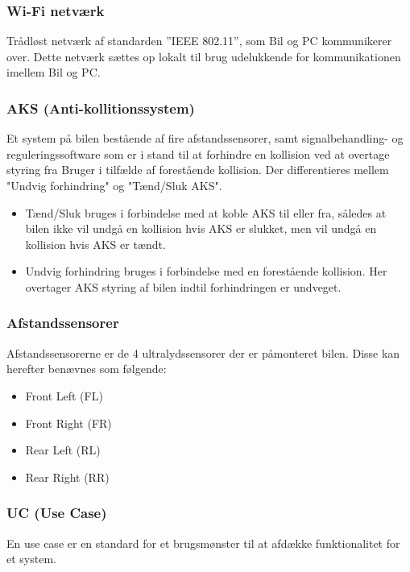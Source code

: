 \subsubsection{Wi-Fi netværk}
Trådløst netværk af standarden ''IEEE 802.11'', som Bil og PC kommunikerer over. Dette netværk sættes op lokalt til brug udelukkende for kommunikationen imellem Bil og PC. 

\subsubsection{AKS (Anti-kollitionssystem)}
Et system på bilen bestående af fire afstandssensorer, samt signalbehandling- og reguleringssoftware som er i stand til at forhindre en kollision ved at overtage styring fra Bruger i tilfælde af forestående kollision. Der differentieres mellem "Undvig forhindring" og "Tænd/Sluk AKS".

\begin{itemize}
	\item Tænd/Sluk bruges i forbindelse med at koble AKS til eller fra, således at bilen ikke vil undgå en kollision hvis AKS er slukket, men vil undgå en kollision hvis AKS er tændt. 
	\item Undvig forhindring bruges i forbindelse med en forestående kollision. Her overtager AKS styring af bilen indtil forhindringen er undveget. 
\end{itemize}

\subsubsection{Afstandssensorer}
Afstandssensorerne er de 4 ultralydssensorer der er påmonteret bilen. Disse kan herefter benævnes som følgende:
\begin{itemize}
	\item Front Left (FL)
	\item Front Right (FR)
	\item Rear Left (RL)
	\item Rear Right (RR)	
\end{itemize}

\subsubsection{UC (Use Case)}
En use case er en standard for et brugsmønster til at afdække funktionalitet for et system.

\clearpage